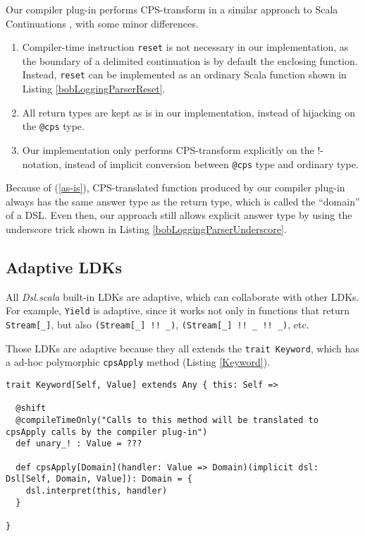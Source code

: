 Our compiler plug-in performs CPS-transform in a similar approach to Scala Continuations \cite{rompf2009implementing}, with some minor differences.

\begin{enumerate}
  
  \item Compiler-time instruction \lstinline{reset} is not necessary in our implementation, as the boundary of a delimited continuation is by default the enclosing function. Instead, \lstinline{reset} can be implemented as an ordinary Scala function shown in Listing \ref{bobLoggingParserReset}.
  
  \item All return types are kept as is in our implementation, instead of hijacking on the \lstinline{@cps} type.
  \label{as-is}

  \item Our implementation only performs CPS-transform explicitly on the !-notation, instead of implicit conversion between \lstinline{@cps} type and ordinary type.

\end{enumerate}

Because of (\ref{as-is}), CPS-translated function produced by our compiler plug-in always has the same answer type as the return type, which is called the ``domain'' of a DSL. Even then, our approach still allows explicit answer type by using the underscore trick shown in Listing \ref{bobLoggingParserUnderscore}.

\subsection{Adaptive LDKs}

All \textit{Dsl.scala} built-in LDKs are adaptive, which can collaborate with other LDKs. For example, \lstinline{Yield} is adaptive, since it works not only in functions that return \lstinline{Stream[_]}, but also \lstinline{(Stream[_] !! _)}, \lstinline{(Stream[_] !! _ !! _)}, etc.

Those LDKs are adaptive because they all extends the \lstinline{trait Keyword}, which has a ad-hoc polymorphic \lstinline{cpsApply} method (Listing \ref{Keyword}).

\begin{lstlisting}[caption={The ad-hoc polymorphism in \lstinline{Keyword}},label={Keyword}]
trait Keyword[Self, Value] extends Any { this: Self =>

  @shift
  @compileTimeOnly("Calls to this method will be translated to cpsApply calls by the compiler plug-in")
  def unary_! : Value = ???

  def cpsApply[Domain](handler: Value => Domain)(implicit dsl: Dsl[Self, Domain, Value]): Domain = {
    dsl.interpret(this, handler)
  }

}
\end{lstlisting}

